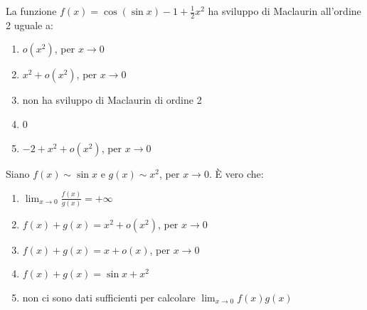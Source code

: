 \begin{quiz}
La funzione $f(x)=\cos(\sin x)-1+\frac12x^2$ ha sviluppo di Maclaurin all'ordine 2 uguale a:
\begin{enumerate}[label=\alph*),leftmargin=1.3cm,itemsep=3pt,topsep=5pt]\item $o(x^2)$, per $x\to0$\item $x^2+o(x^2)$, per $x\to0$\item non ha sviluppo di Maclaurin di ordine 2\item $0$\item $-2+x^2+o(x^2)$, per $x\to0$\end{enumerate}
\end{quiz}

\begin{quiz}
Siano $f(x)\sim\sin x$ e $g(x)\sim x^2$, per $x\to0$. È vero che:
\begin{enumerate}[label=\alph*),leftmargin=1.3cm,itemsep=3pt,topsep=5pt]\item $\lim_{x\to0}\frac{f(x)}{g(x)}=+\infty$\item $f(x)+g(x)=x^2+o(x^2)$, per $x\to0$\item $f(x)+g(x)=x+o(x)$, per $x\to0$\item $f(x)+g(x)=\sin x+x^2$\item non ci sono dati sufficienti per calcolare $\lim_{x\to0}f(x)g(x)$\end{enumerate}
\end{quiz}

